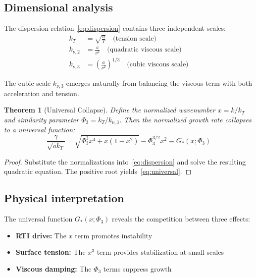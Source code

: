 \documentclass[aps,pre,twocolumn,showpacs,superscriptaddress]{revtex4-2}
\newtheorem{theorem}{Theorem}
\theoremstyle{definition}
\begin{document}
\subsection{Dimensional analysis}

The dispersion relation~\eqref{eq:dispersion} contains three independent scales:
\begin{align}
k_T &= \sqrt{\frac{a}{T}} \quad \text{(tension scale)} \\
k_{\nu,2} &= \frac{a}{\nu^2} \quad \text{(quadratic viscous scale)} \\
k_{\nu,3} &= \left(\frac{a}{\nu^2}\right)^{1/3} \quad \text{(cubic viscous scale)}
\end{align}

The cubic scale $k_{\nu,3}$ emerges naturally from balancing the viscous term with both acceleration and tension.

\begin{theorem}[Universal Collapse]
\label{thm:collapse}
Define the normalized wavenumber $x = k/k_T$ and similarity parameter $\Phi_3 = k_T/k_{\nu,3}$. Then the normalized growth rate collapses to a universal function:
\begin{equation}
\frac{\gamma}{\sqrt{ak_T}} = \sqrt{\Phi_3^3 x^4 + x(1-x^2)} - \Phi_3^{3/2} x^2 \equiv G_*(x;\Phi_3)
\label{eq:universal}
\end{equation}
\end{theorem}

\begin{proof}
Substitute the normalizations into~\eqref{eq:dispersion} and solve the resulting quadratic equation. The positive root yields~\eqref{eq:universal}.
\end{proof}

\subsection{Physical interpretation}

The universal function $G_*(x;\Phi_3)$ reveals the competition between three effects:
\begin{itemize}
\item \textbf{RTI drive:} The $x$ term promotes instability
\item \textbf{Surface tension:} The $x^3$ term provides stabilization at small scales
\item \textbf{Viscous damping:} The $\Phi_3$ terms suppress growth
\end{itemize}
\end{document}
